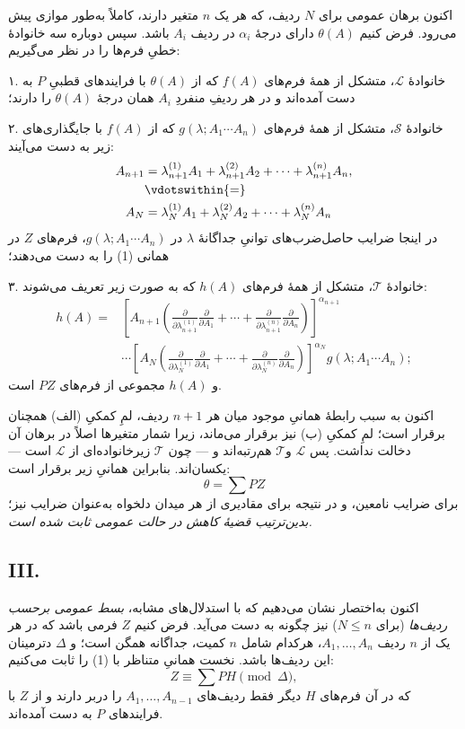 \documentclass[11pt]{article}
\begin{document}
اکنون برهان عمومی برای $N$ ردیف، که هر یک $n$ متغیر دارند، کاملاً به‌طور موازی پیش می‌رود. فرض کنیم $\theta(A)$ دارای درجهٔ $\alpha_i$ در ردیف $A_i$ باشد. سپس دوباره سه خانوادهٔ خطیِ فرم‌ها را در نظر می‌گیریم:

۱. خانوادهٔ $\mathcal L$، متشکل از همهٔ فرم‌های $f(A)$ که از $\theta(A)$ با فرایندهای قطبیِ $P$ به دست آمده‌اند و در هر ردیفِ منفردِ $A_i$ همان درجهٔ $\theta(A)$ را دارند؛

۲. خانوادهٔ $\mathcal S$، متشکل از همهٔ فرم‌های $g(\lambda;A_1\cdots A_n)$ که از $f(A)$ با جایگذاری‌های زیر به دست می‌آیند:
\[
\begin{aligned}
 A_{n+1}&=\lambda_{n+1}^{(1)}A_1+\lambda_{n+1}^{(2)}A_2+
        \cdots+\lambda_{n+1}^{(n)}A_n,\\
 &\vdotswithin{=}\\
 A_N&=\lambda_N^{(1)}A_1+\lambda_N^{(2)}A_2+
        \cdots+\lambda_N^{(n)}A_n
\end{aligned}
\]
در اینجا ضرایب حاصل‌ضرب‌های توانیِ جداگانهٔ $\lambda$ در $g(\lambda;A_1\cdots A_n)$، فرم‌های $Z$ در همانی (1) را به دست می‌دهند؛

۳. خانوادهٔ $\mathcal T$، متشکل از همهٔ فرم‌های $h(A)$ که به صورت زیر تعریف می‌شوند:
\[
\begin{aligned}
 h(A)=&\left[A_{n+1}\left(
 \frac{\partial}{\partial\lambda_{n+1}^{(1)}}\frac{\partial}{\partial A_1}
 +\cdots+
 \frac{\partial}{\partial\lambda_{n+1}^{(n)}}\frac{\partial}{\partial A_n}\right)\right]^{\alpha_{n+1}} \\
&\cdots
\left[A_N\left(
 \frac{\partial}{\partial\lambda_N^{(1)}}\frac{\partial}{\partial A_1}
 +\cdots+
 \frac{\partial}{\partial\lambda_N^{(n)}}\frac{\partial}{\partial A_n}\right)\right]^{\alpha_N}
 g(\lambda;A_1\cdots A_n);
\end{aligned}
\]
و $h(A)$ مجموعی از فرم‌های $PZ$ است.

اکنون به سبب رابطهٔ همانیِ موجود میان هر $n+1$ ردیف، لمِ کمکیِ (الف) همچنان برقرار است؛ لمِ کمکیِ (ب) نیز برقرار می‌ماند، زیرا شمار متغیرها اصلاً در برهان آن دخالت نداشت. پس $\mathcal L$ و$\mathcal T$ هم‌رتبه‌اند و — چون $\mathcal T$ زیرخانواده‌ای از $\mathcal L$ است — یکسان‌اند. بنابراین همانیِ زیر برقرار است:
\[
  \theta=\sum PZ
\]
برای ضرایب نامعین، و در نتیجه برای مقادیری از هر میدان دلخواه به‌عنوان ضرایب نیز؛ \emph{بدین‌ترتیب قضیهٔ کاهش در حالت عمومی ثابت شده است.}

\subsection*{III.}
اکنون به‌اختصار نشان می‌دهیم که با استدلال‌های مشابه، \emph{بسط عمومی برحسب ردیف‌ها} (برای $N\le n$) نیز چگونه به دست می‌آید. فرض کنیم $Z$ فرمی باشد که در هر یک از $n$ ردیف $A_1,
\ldots,A_n$، هرکدام شامل $n$ کمیت، جداگانه همگن است؛ و $\Delta$ دترمینان این ردیف‌ها باشد. نخست همانیِ متناظر با (1) را ثابت می‌کنیم:
\begin{equation}
  Z\equiv\sum PH \pmod{\Delta},
\tag{2}
\end{equation}
که در آن فرم‌های $H$ دیگر فقط ردیف‌های $A_1,\ldots,A_{n-1}$ را دربر دارند و از $Z$ با فرایندهای $P$ به دست آمده‌اند.
\end{document}
